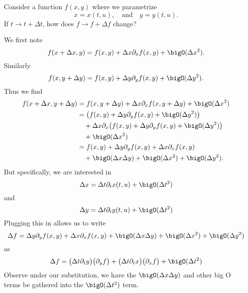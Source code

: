 
Consider a function $f(x,y)$ where we parametrize 
\begin{equation}
x=x(t,u),\quad\mbox{and}\quad y=y(t,u).
\end{equation}
If $t\to t+\Delta t$, how does $f\to f+\Delta f$ change?

\M
We first note
\begin{equation}
f(x+\Delta x,y) = f(x,y)+\Delta x\partial_{x}f(x,y)+\bigO(\Delta
x^{2}).
\end{equation}
Similarly 
\begin{equation}
f(x,y+\Delta y)= f(x,y)+\Delta y\partial_{y}f(x,y)+\bigO(\Delta
y^{2}).
\end{equation}
Thus we find
\begin{equation}
\begin{aligned}
f(x+\Delta x,y+\Delta y)
&=f(x,y+\Delta y)+\Delta x\partial_{x}f(x,y + \Delta y)+\bigO(\Delta
x^{2})\\
&=\bigl(f(x,y) + \Delta y\partial_{y}f(x,y) + \bigO(\Delta
y^{2})\bigr)\\
&\quad+ \Delta x\partial_{x}\bigl(f(x,y) + \Delta y\partial_{y}f(x,y) + \bigO(\Delta
y^{2})\bigr)\\
&\quad+\bigO(\Delta x^{2})\\
&= f(x,y) + \Delta y\partial_{y}f(x,y) + \Delta
x\partial_{x}f(x,y)\\
&\quad + \bigO(\Delta x\Delta y)%
+\bigO(\Delta x^{2})+\bigO(\Delta y^{2}).
\end{aligned}
\end{equation}
But specifically, we are interested in
\begin{equation}
\Delta x = \Delta t\partial_{t}x(t,u)+\bigO(\Delta t^{2})
\end{equation}
and
\begin{equation}
\Delta y = \Delta t\partial_{t}y(t,u)+\bigO(\Delta t^{2})
\end{equation}
Plugging this in allows us to write
\begin{equation}
\Delta f=\Delta y\partial_{y}f(x,y) + \Delta
x\partial_{x}f(x,y) + \bigO(\Delta x\Delta y)%
+\bigO(\Delta x^{2})+\bigO(\Delta y^{2})
\end{equation}
as
\begin{equation}
\Delta f = \bigl(\Delta t\partial_{t}y\bigr)\bigl(\partial_{y}f\bigr) +
\bigl(\Delta t\partial_{t}x\bigr)\bigl(\partial_{x}f\bigr) +
\bigO(\Delta t^{2})
\end{equation}
Observe under our substitution, we have the $\bigO(\Delta
x\Delta y)$ and other big O terms be gathered into the
$\bigO(\Delta t^{2})$ term.

